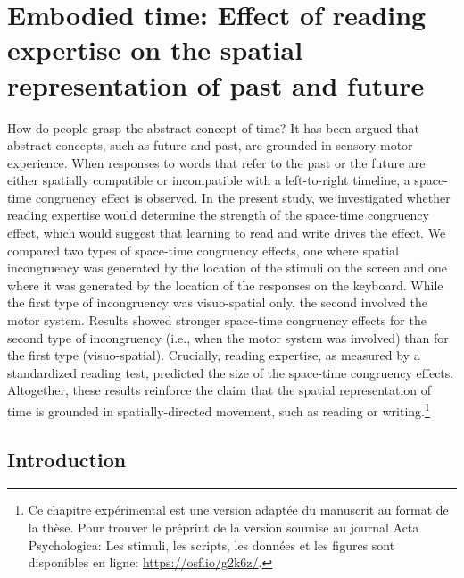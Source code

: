 \documentclass[
  a4paper,12pt,twoside,onecolumn,openright,final,oldfontcommands]{memoir}
\newcommand\chaptercolor{gray}
\newcommand{\changechaptercolor}[1]{
  \renewcommand\chaptercolor{#1}
}
\newcommand{\initial}[1]{
	\lettrine[lines=3,lhang=0.33,nindent=0em]{
		\color{gray}
     		{\textsc{#1}}}{}}
\begin{document}
\changechaptercolor{hokusai5}

\hypertarget{chap5}{%
\chapter{Embodied time: Effect of reading expertise on the spatial representation of past and future}\label{chap5}}

\initial{H}ow do people grasp the abstract concept of time? It has been argued that abstract concepts, such as future and past, are grounded in sensory-motor experience. When responses to words that refer to the past or the future are either spatially compatible or incompatible with a left-to-right timeline, a space-time congruency effect is observed. In the present study, we investigated whether reading expertise would determine the strength of the space-time congruency effect, which would suggest that learning to read and write drives the effect. We compared two types of space-time congruency effects, one where spatial incongruency was generated by the location of the stimuli on the screen and one where it was generated by the location of the responses on the keyboard. While the first type of incongruency was visuo-spatial only, the second involved the motor system. Results showed stronger space-time congruency effects for the second type of incongruency (i.e., when the motor system was involved) than for the first type (visuo-spatial). Crucially, reading expertise, as measured by a standardized reading test, predicted the size of the space-time congruency effects. Altogether, these results reinforce the claim that the spatial representation of time is grounded in spatially-directed movement, such as reading or writing.\footnote{Ce chapitre expérimental est une version adaptée du manuscrit au format de la thèse. Pour trouver le préprint de la version soumise au journal Acta Psychologica: Les stimuli, les scripts, les données et les figures sont disponibles en ligne: \url{https://osf.io/g2k6z/}.}

\hypertarget{introduction-2}{%
\section{Introduction}\label{introduction-2}}
\end{document}

